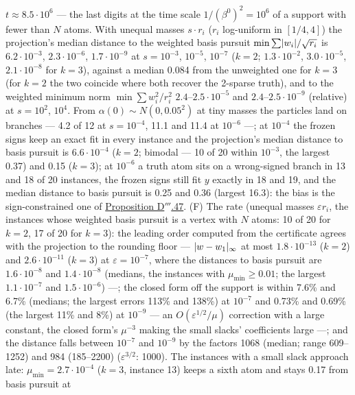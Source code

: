 \begin{sloppypar}
$t\approx8.5\cdot10^6$ --- the last digits at the time scale $1/(\beta^0)^2 = 10^6$ of a support with fewer than $N$
atoms. With unequal masses $s\cdot r_i$ ($r_i$ log-uniform in $[1/4,4]$) the projection's median distance to the
weighted basis pursuit $\min\sum\lvert w_i\rvert/\sqrt{r_i}$ is $6.2\cdot10^{-3}$, $2.3\cdot10^{-6}$, $1.7\cdot10^{-9}$ at
$s = 10^{-3}$, $10^{-5}$, $10^{-7}$ ($k = 2$; $1.3\cdot10^{-2}$, $3.0\cdot10^{-5}$, $2.1\cdot10^{-8}$ for $k = 3$),
against a median 0.084 from the unweighted one for $k = 3$ (for $k = 2$ the two coincide where both recover the
2-sparse truth), and to the weighted minimum norm $\min\sum w_i^2/r_i^2$ $2.4$--$2.5\cdot10^{-5}$ and
$2.4$--$2.5\cdot10^{-9}$ (relative) at $s = 10^2$, $10^4$. From $\alpha(0)\sim N(0,0.05^2)$ at tiny masses the particles
land on branches --- 4.2 of 12 at $s = 10^{-4}$, 11.1 and 11.4 at $10^{-6}$ ---; at $10^{-4}$ the frozen signs keep an
exact fit in every instance and the projection's median distance to basis pursuit is $6.6\cdot10^{-4}$ ($k = 2$;
bimodal --- 10 of 20 within $10^{-3}$, the largest 0.37) and 0.15 ($k = 3$); at $10^{-6}$ a truth atom sits on a
wrong-signed branch in 13 and 18 of 20 instances, the frozen signs still fit $y$ exactly in 18 and 19, and the median
distance to basis pursuit is 0.25 and 0.36 (largest 16.3): the bias is the sign-constrained one of
\hyperref[res:thmDppp:47]{Proposition D$'''$.47}. (F) The rate (unequal masses $\varepsilon r_i$, the instances whose
weighted basis pursuit is a vertex with $N$ atoms: 10 of 20 for $k = 2$, 17 of 20 for $k = 3$): the leading order
computed from the certificate agrees with the projection to the rounding floor --- $\lvert w - w_1\rvert_\infty$ at most
$1.8\cdot10^{-13}$ ($k = 2$) and $2.6\cdot10^{-11}$ ($k = 3$) at $\varepsilon = 10^{-7}$, where the distances to basis
pursuit are $1.6\cdot10^{-8}$ and $1.4\cdot10^{-8}$ (medians, the instances with $\mu_{\min}\ge0.01$; the largest
$1.1\cdot10^{-7}$ and $1.5\cdot10^{-6}$) ---; the closed form off the support is within 7.6\% and 6.7\% (medians; the
largest errors 113\% and 138\%) at $10^{-7}$ and 0.73\% and 0.69\% (the largest 11\% and 8\%) at $10^{-9}$ --- an
$O(\varepsilon^{1/2}/\mu)$ correction with a large constant, the closed form's $\mu^{-3}$ making the small slacks'
coefficients large ---; and the distance falls between $10^{-7}$ and $10^{-9}$ by the factors 1068 (median; range
609--1252) and 984 (185--2200) ($\varepsilon^{3/2}$: 1000). The instances with a small slack approach late:
$\mu_{\min} = 2.7\cdot10^{-4}$ ($k = 3$, instance 13) keeps a sixth atom and stays 0.17 from basis pursuit at

\end{sloppypar}
